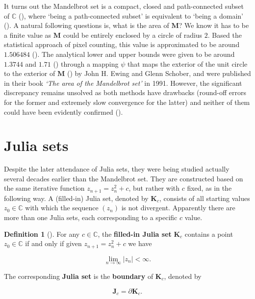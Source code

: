 \documentclass[a4paper,11pt]{article}
\theoremstyle{definition}
\newtheorem{defn}[prop]{Definition}
\begin{document}
It turns out the Mandelbrot set is a compact, closed and path-connected subset of $\mathbb{C}$ (\autocite[Page 95]{ewing}), where `being a path-connected subset' is equivalent to `being a domain' (\autocite[Page 6]{belk}). A natural following questions is, what is the area of $\mathbf{M}$? We know it has to be a finite value as $\mathbf{M}$ could be entirely enclosed by a circle of radius $2$. Based the statistical approach of pixel counting, this value is approximated to be around $1.506484$ (\autocite{mitchell}). The analytical lower and upper bounds were given to be around $1.3744$ and $1.71$ (\autocite[Page 71]{ewing_schober}) through a mapping $\psi$ that maps the exterior of the unit circle to the exterior of $\mathbf{M}$ (\autocite[Page 69]{ewing_schober}) by John H. Ewing and Glenn Schober, and were published in their book \emph{`The area of the Mandelbrot set'} in 1991. However, the significant discrepancy remains unsolved as both methods have drawbacks (round-off errors for the former and extremely slow convergence for the latter) and neither of them could have been evidently confirmed (\autocite[Page 99]{ewing}).

\section{Julia sets}

Despite the later attendance of Julia sets, they were being studied actually several decades earlier than the Mandelbrot set. They are constructed based on the same iterative function $z_{n+1} = z_n^2 + c$, but rather with $c$ fixed, as in the following way. A (filled-in) Julia set, denoted by $\mathbf{K}_c$, consists of all starting values $z_0\in\mathbb{C}$ with which the sequence $(z_n)$ is not divergent. Apparently there are more than one Julia sets, each corresponding to a specific $c$ value.

\begin{defn}[{\autocite[Page 587]{tan}}]
For any $c\in\mathbb{C}$, the \textbf{filled-in Julia set} $\mathbf{K}_c$ contains a point $z_0\in\mathbb{C}$ if and only if given $z_{n+1} = z_n^2+c$ we have 

\begin{equation*}
\lim_{n\rightarrow\infty}|z_n| < \infty.
\end{equation*}

The corresponding \textbf{Julia set} is the \textbf{boundary} of $\mathbf{K}_c$, denoted by 

\begin{equation*}
    \mathbf{J}_c = \partial\mathbf{K}_c.
\end{equation*}
\end{defn}
\end{document}
